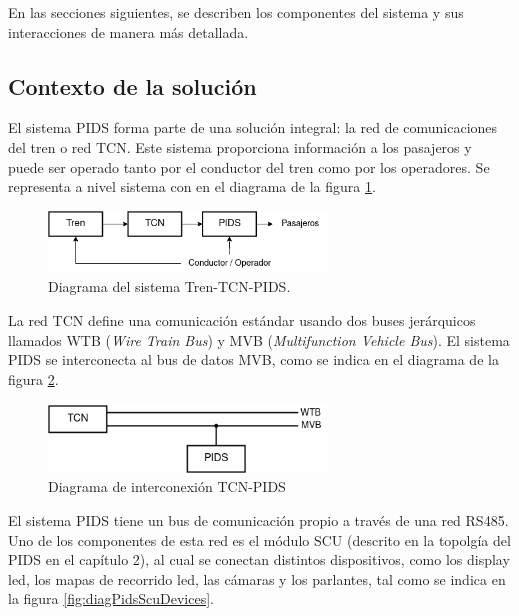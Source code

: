En las secciones siguientes, se describen los componentes del sistema y sus interacciones de manera más detallada. \

\subsection{Contexto de la solución}

El sistema PIDS forma parte de una solución integral: la red de comunicaciones del tren o red TCN. Este sistema proporciona información a los pasajeros y puede ser operado tanto por el conductor del tren como por los operadores. Se representa a nivel sistema con en el diagrama de la figura \ref{fig:diagTrenTcnPids}.\\

\begin{figure}[ht]
	\centering
	\includegraphics[width=0.66\textwidth]{./Figures/diagTrenTcnPids.png}
	\caption{Diagrama del sistema Tren-TCN-PIDS.}
	\label{fig:diagTrenTcnPids}
\end{figure}

La red TCN define una comunicación estándar usando dos buses jerárquicos llamados WTB (\textit{Wire Train Bus}) y MVB (\textit{Multifunction Vehicle Bus}). El sistema PIDS se interconecta al bus de datos MVB, como se indica en el diagrama de la figura \ref{fig:diagTcnPidsBuusesWtbMvb}.\\


\begin{figure}[ht]
	\centering
	\includegraphics[width=0.66\textwidth]{./Figures/diagTcnPidsBusesWtbMvb.png}
	\caption{Diagrama de interconexión TCN-PIDS}
	\label{fig:diagTcnPidsBuusesWtbMvb}
\end{figure}

El sistema PIDS tiene un bus de comunicación propio a través de una red RS485. Uno de los componentes de esta red es el módulo SCU (descrito en la topolgía del PIDS en el capítulo 2), al cual se conectan distintos dispositivos, como los display led, los mapas de recorrido led, las cámaras y los parlantes, tal como se indica en la figura 	\ref{fig:diagPidsScuDevices}.\\


